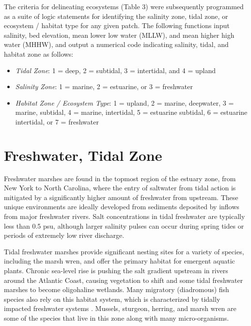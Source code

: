 \documentclass[
]{book}
\providecommand{\tightlist}{%
  \setlength{\itemsep}{0pt}\setlength{\parskip}{0pt}}
\begin{document}
The criteria for delineating ecosystems (Table 3) were subsequently programmed as a suite of logic statements for identifying the salinity zone, tidal zone, or ecosystem / habitat type for any given patch. The following functions input salinity, bed elevation, mean lower low water (MLLW), and mean higher high water (MHHW), and output a numerical code indicating salinity, tidal, and habitat zone as follows:

\begin{itemize}
\tightlist
\item
  \emph{Tidal Zone}: 1 = deep, 2 = subtidal, 3 = intertidal, and 4 = upland
\item
  \emph{Salinity Zone}: 1 = marine, 2 = estuarine, or 3 = freshwater\\
\item
  \emph{Habitat Zone / Ecosystem Type}: 1 = upland, 2 = marine, deepwater, 3 = marine, subtidal, 4 = marine, intertidal, 5 = estuarine subtidal, 6 = estuarine intertidal, or 7 = freshwater
\end{itemize}

\hypertarget{freshwater-tidal-zone}{%
\section{Freshwater, Tidal Zone}\label{freshwater-tidal-zone}}

Freshwater marshes are found in the topmost region of the estuary zone, from New York to North Carolina, where the entry of saltwater from tidal action is mitigated by a significantly higher amount of freshwater from upstream. These unique environments are ideally developed from sediments deposited by inflows from major freshwater rivers. Salt concentrations in tidal freshwater are typically less than 0.5 psu, although larger salinity pulses can occur during spring tides or periods of extremely low river discharge.

Tidal freshwater marshes provide significant nesting sites for a variety of species, including the marsh wren, and offer the primary habitat for emergent aquatic plants. Chronic sea-level rise is pushing the salt gradient upstream in rivers around the Atlantic Coast, causing vegetation to shift and some tidal freshwater marshes to become oligohaline wetlands. Many migratory (diadromous) fish species also rely on this habitat system, which is characterized by tidally impacted freshwater systems \citep{pasternack_biogeomorphology_2000}. Mussels, sturgeon, herring, and marsh wren are some of the species that live in this zone along with many micro-organisms.
\end{document}
